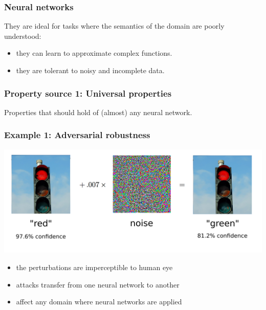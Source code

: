 \documentclass[t,compress,aspectratio=169]{beamer}
\begin{document}
\begin{frame}
\frametitle{Neural networks}

They are ideal for tasks where the semantics of the domain are poorly understood:

\pause
    
\begin{itemize}[<+->]
  	\item they can learn to approximate complex functions.
  	\item they are tolerant to noisy and incomplete data.
\end{itemize}


\vspace{1em}


\vspace{1em}


\end{frame}

\begin{frame}
\frametitle{Property source 1: Universal properties}

Properties that should hold of (almost) any neural network.
\end{frame}

\begin{frame}
\frametitle{Example 1: Adversarial robustness}
\centering

\includegraphics[width=.7\textwidth]{img/adversarial-attack.png}
\pause
\begin{itemize}
\item the perturbations are imperceptible to human eye \pause
\item attacks transfer from one neural network to another \pause
\item affect any domain where neural networks are applied
\end{itemize}
\end{frame}
\end{document}
